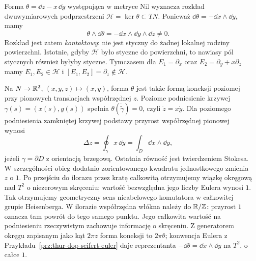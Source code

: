\begin{przyklad}
\label{prz:thur-dop-nil-kontakt}
Forma $\theta=\dd z-x\,\dd y$ występująca w metryce Nil
wyznacza rozkład dwuwymiarowych podprzestrzeni
$\mathcal H=\ker\theta\subset TN$.
Ponieważ $\dd\theta=-\dd x\wedge\dd y$, mamy
\[
 \theta\wedge\dd\theta=-\dd x\wedge\dd y\wedge\dd z\ne0.
\]
Rozkład jest zatem \emph{kontaktowy}: nie jest styczny
do żadnej lokalnej rodziny powierzchni. Istotnie, gdyby
$\mathcal H$ było styczne do powierzchni, to nawiasy pól
stycznych również byłyby styczne. Tymczasem dla
$E_1=\partial_x$ oraz $E_2=\partial_y+x\partial_z$
mamy $E_1,E_2\in\mathcal H$ i
$[E_1,E_2]=\partial_z\notin\mathcal H$.

Na $N\to\mathbb{R}^2$, $(x,y,z)\mapsto(x,y)$,
forma $\theta$ jest także formą koneksji poziomej
przy pionowych translacjach współrzędnej $z$.
Poziome podniesienie krzywej $\gamma(s)=(x(s),y(s))$
spełnia $\theta(\dot{\widetilde\gamma})=0$, czyli
$\dot z=x\dot y$. Dla poziomego podniesienia zamkniętej
krzywej podstawy przyrost współrzędnej pionowej wynosi
\begin{equation}\label{eq:thur-dop-nil-holonomia-pola}
 \Delta z=\oint_\gamma x\,\dd y
 =\int_D\dd x\wedge\dd y,
\end{equation}
jeżeli $\gamma=\partial D$ z orientacją brzegową.
Ostatnia równość jest twierdzeniem Stokesa.
W szczególności obieg dodatnio zorientowanego
kwadratu jednostkowego zmienia $z$ o $1$.
Po przejściu do ilorazu przez kratę całkowitą otrzymujemy
wiązkę okręgową nad $T^2$ o niezerowym skręceniu;
wartość bezwzględna jego liczby Eulera wynosi $1$.
Tak otrzymujemy geometryczny sens nieabelowego
komutatora w całkowitej grupie Heisenberga.
W ilorazie współrzędna włókna należy do $\mathbb{R}/\mathbb{Z}$:
przyrost $1$ oznacza tam powrót do tego samego punktu.
Jego całkowita wartość na podniesieniu rzeczywistym
zachowuje informację o skręceniu. Z generatorem okręgu
zapisanym jako kąt $2\pi z$ forma koneksji to $2\pi\theta$;
konwencja Eulera z Przykładu~\ref{prz:thur-dop-seifert-euler}
daje reprezentanta $-\dd\theta=\dd x\wedge\dd y$ na $T^2$,
o całce $1$.
\end{przyklad}

